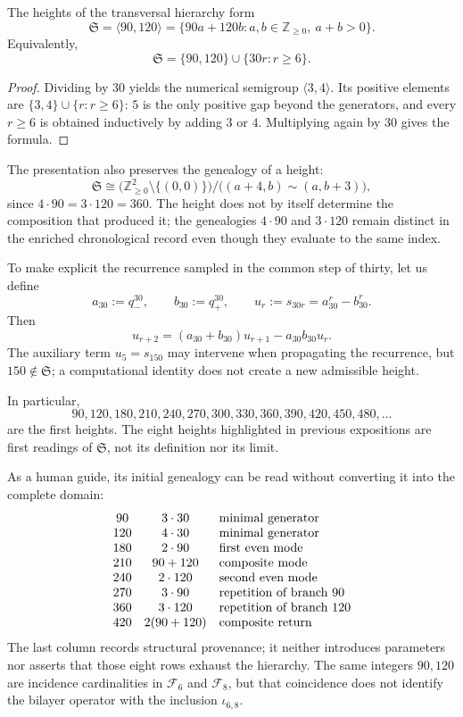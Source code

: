 \begin{theorem}
\label{thm:semigrupo-alturas-rev7}
The heights of the transversal hierarchy form
\[
 \mathfrak S
 =\langle90,120\rangle
 =\{90a+120b:a,b\in\mathbb Z_{\ge0},\ a+b>0\}.
\]
Equivalently,
\[
 \boxed{\mathfrak S=\{90,120\}\cup\{30r:r\ge6\}.}
\]
\end{theorem}

\begin{proof}
Dividing by \(30\) yields the numerical semigroup
\(\langle3,4\rangle\). Its positive elements are
\(\{3,4\}\cup\{r:r\ge6\}\): \(5\) is the only positive gap beyond
the generators, and every \(r\ge6\) is obtained inductively by adding \(3\) or
\(4\). Multiplying again by \(30\) gives the formula.
\end{proof}

The presentation also preserves the genealogy of a height:
\[
 \mathfrak S\cong
 \bigl(\mathbb Z_{\ge0}^2\setminus\{(0,0)\}\bigr)
 \big/\bigl((a+4,b)\sim(a,b+3)\bigr),
\]
since \(4\cdot90=3\cdot120=360\). The height does not by itself determine the
composition that produced it; the genealogies \(4\cdot90\) and \(3\cdot120\)
remain distinct in the enriched chronological record even though they evaluate
to the same index.

To make explicit the recurrence sampled in the common step of thirty,
let us define
\[
 a_{30}:=q_-^{30},\qquad b_{30}:=q_+^{30},\qquad
 u_r:=s_{30r}=a_{30}^r-b_{30}^r.
\]
Then
\[
 \boxed{u_{r+2}=(a_{30}+b_{30})u_{r+1}-a_{30}b_{30}u_r.}
\]
The auxiliary term \(u_5=s_{150}\) may intervene when propagating the
recurrence, but \(150\notin\mathfrak S\); a computational identity does not create
a new admissible height.

In particular,
\[
90,120,180,210,240,270,300,330,360,390,420,450,480,\ldots
\]
are the first heights. The eight heights highlighted in previous
expositions are first readings of \(\mathfrak S\), not its definition nor
its limit.

As a human guide, its initial genealogy can be read without converting it into the
complete domain:
\[
\begin{array}{c@{\quad}c@{\quad}l}
90&3\cdot30&\text{minimal generator}\\
120&4\cdot30&\text{minimal generator}\\
180&2\cdot90&\text{first even mode}\\
210&90+120&\text{composite mode}\\
240&2\cdot120&\text{second even mode}\\
270&3\cdot90&\text{repetition of branch 90}\\
360&3\cdot120&\text{repetition of branch 120}\\
420&2(90+120)&\text{composite return}
\end{array}
\]
The last column records structural provenance; it neither introduces parameters
nor asserts that those eight rows exhaust the hierarchy. The same integers
\(90,120\) are incidence cardinalities in \(\mathcal F_6\) and
\(\mathcal F_8\), but that coincidence does not identify the bilayer operator with
the inclusion \(\iota_{6,8}\).

